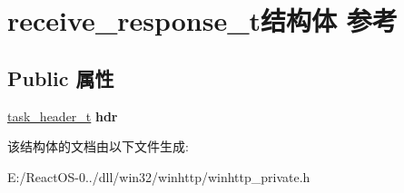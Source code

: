 \hypertarget{structreceive__response__t}{}\section{receive\+\_\+response\+\_\+t结构体 参考}
\label{structreceive__response__t}
\subsection*{Public 属性}
\begin{DoxyCompactItemize}
\item 
\mbox{\label{structreceive__response__t_ab5af81ee742aba77839b7d1fd6f18f7a}} 
\hyperlink{structtask__header__t}{task\+\_\+header\+\_\+t} {\bfseries hdr}
\end{DoxyCompactItemize}


该结构体的文档由以下文件生成\+:\begin{DoxyCompactItemize}
\item 
E\+:/\+React\+O\+S-\/0../dll/win32/winhttp/winhttp\+\_\+private.\+h\end{DoxyCompactItemize}
